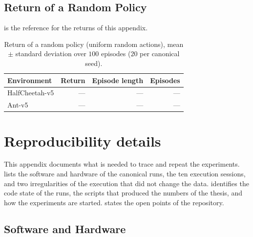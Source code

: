\section{Return of a Random Policy}\label{sec:app-learn-random}

 is the reference for the returns of this appendix.

\begin{table}[tbp]
  \centering
  \caption{Return of a random policy (uniform random actions), mean $\pm$ standard deviation over $100$ episodes ($20$ per canonical seed).}
  \label{tab:app-random}
  \begin{tabular}{lrrr}
    \toprule
    Environment    & Return & Episode length & Episodes \\
    \midrule
    HalfCheetah-v5 & ---    & ---            & ---      \\
    Ant-v5         & ---    & ---            & ---      \\
    \bottomrule
  \end{tabular}
\end{table}

\chapter{Reproducibility details}
\label{app:reproducibility}

This appendix documents what is needed to trace and repeat the experiments.
 lists the software and hardware of the canonical runs,  the ten execution sessions, and  two irregularities of the execution that did not change the data.
 identifies the code state of the runs,  the scripts that produced the numbers of the thesis, and  how the experiments are started.
 states the open points of the repository.

\section{Software and Hardware}\label{sec:app-repro-env}

